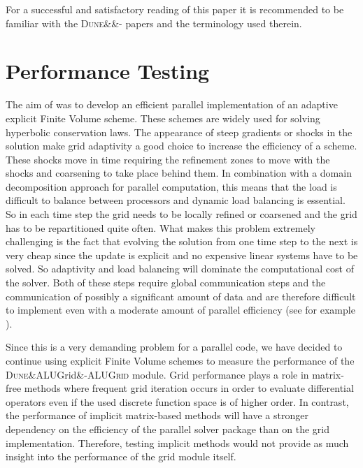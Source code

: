 \documentclass[10pt,notitlepage,a4paper]{article}
\newcommand{\dune}[1][]{\textsc{Dune}\ifx&#1&\else\textsc{-{#1}}\fi\xspace}
\begin{document}
For a successful and satisfactory reading of this paper it is 
recommended to be familiar with the \dune papers \cite{dunepaperII:08,dunepaperI:08}
and the terminology used therein. 

\section{Performance Testing}
\label{sec:performance testing}

The aim of \cite{schupp:phd} was to develop an efficient parallel
implementation of an adaptive explicit Finite Volume scheme. These schemes are
widely used for solving hyperbolic conservation laws. The appearance of steep
gradients or shocks in the solution make grid adaptivity a good choice to
increase the efficiency of a scheme. These shocks move in time requiring the
refinement zones to move with the shocks and coarsening to take place
behind them. In combination with a domain decomposition approach for
parallel computation, this means that the load is difficult to balance
between processors and dynamic load balancing is essential. So in each time
step the grid needs to be locally refined or coarsened and the grid has to be
repartitioned quite often. What makes this problem extremely challenging is
the fact that evolving the solution from one time step to the next is very
cheap since the update is explicit and no expensive linear systems have 
to be solved. So adaptivity and load balancing will dominate the
computational cost of the solver. Both of these steps require global
communication steps and the communication of possibly a significant amount
of data and are therefore difficult to implement even with a moderate
amount of parallel efficiency (see for example \cite{burstedde:11}).

Since this is a very demanding problem for a parallel code,
we have decided to continue using explicit Finite Volume schemes to measure the
performance of the \dune[ALUGrid] module. Grid performance plays a role in 
matrix-free methods where frequent grid iteration occurs 
in order to evaluate differential operators even if the used discrete function space is of higher
order.
In contrast, the performance of implicit matrix-based methods will have a
stronger dependency on the efficiency of the parallel solver package
than on the grid implementation.
Therefore, testing implicit methods would not provide as much insight into the
performance of the grid module itself.
\end{document}
